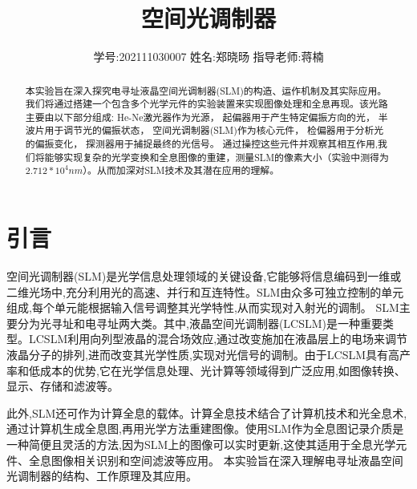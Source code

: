 \documentclass[11pt,a4paper]{article}
\title{\vspace{-4cm}\Large 空间光调制器}  %
\author{\kaishu 学号:202111030007 \hspace{1.5cm} 姓名:郑晓旸 \hspace{1.5cm} 指导老师:蒋楠}   %
\date{}
\begin{document}
\maketitle

\begin{abstract}
    本实验旨在深入探究电寻址液晶空间光调制器(SLM)的构造、运作机制及其实际应用。我们将通过搭建一个包含多个光学元件的实验装置来实现图像处理和全息再现。该光路主要由以下部分组成:
    He-Ne激光器作为光源，
    起偏器用于产生特定偏振方向的光，
    半波片用于调节光的偏振状态，
    空间光调制器(SLM)作为核心元件，
    检偏器用于分析光的偏振变化，
    探测器用于捕捉最终的光信号。
    通过操控这些元件并观察其相互作用,我们将能够实现复杂的光学变换和全息图像的重建，测量SLM的像素大小（实验中测得为$2.712*10^4nm$）。从而加深对SLM技术及其潜在应用的理解。
\end{abstract}

\section{引言}
空间光调制器(SLM)是光学信息处理领域的关键设备,它能够将信息编码到一维或二维光场中,充分利用光的高速、并行和互连特性。SLM由众多可独立控制的单元组成,每个单元能根据输入信号调整其光学特性,从而实现对入射光的调制。
SLM主要分为光寻址和电寻址两大类。其中,液晶空间光调制器(LCSLM)是一种重要类型。LCSLM利用向列型液晶的混合场效应,通过改变施加在液晶层上的电场来调节液晶分子的排列,进而改变其光学性质,实现对光信号的调制。由于LCSLM具有高产率和低成本的优势,它在光学信息处理、光计算等领域得到广泛应用,如图像转换、显示、存储和滤波等。

此外,SLM还可作为计算全息的载体。计算全息技术结合了计算机技术和光全息术,通过计算机生成全息图,再用光学方法重建图像。使用SLM作为全息图记录介质是一种简便且灵活的方法,因为SLM上的图像可以实时更新,这使其适用于全息光学元件、全息图像相关识别和空间滤波等应用。
本实验旨在深入理解电寻址液晶空间光调制器的结构、工作原理及其应用。
\end{document}
